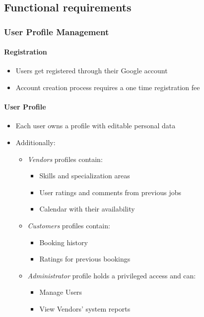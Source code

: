 \documentclass[11pt,a4paper]{article}
\begin{document}
\subsection{Functional requirements}

\subsubsection{User Profile Management}

\paragraph{Registration}

\begin{itemize}
  \item Users get registered through their Google account
  \item Account creation process requires a one time registration fee
\end{itemize}

\paragraph{User Profile}
\begin{itemize}
  \item Each user owns a profile with editable personal data
  \item Additionally:
    \begin{itemize}
      \item \textit{Vendors} profiles contain:
        \begin{itemize}
          \item Skills and specialization areas
          \item User ratings and comments from previous jobs
          \item Calendar with their availability
        \end{itemize}
      \item \textit{Customers} profiles contain:
        \begin{itemize}
          \item Booking history
          \item Ratings for previous bookings
        \end{itemize}
      \item  \textit{Administrator} profile holds a privileged access and can:
        \begin{itemize}
          \item Manage Users
          \item View Vendors' system reports
        \end{itemize}
    \end{itemize}
\end{itemize}
\end{document}
